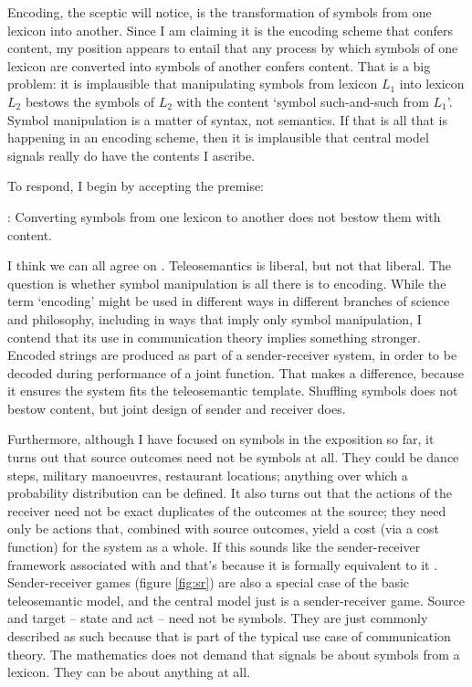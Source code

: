 \documentclass[12pt]{article}
\begin{document}
Encoding, the sceptic will notice, is the transformation of symbols from one lexicon into another.
Since I am claiming it is the encoding scheme that confers content, my position appears to entail that any process by which symbols of one lexicon are converted into symbols of another confers content.
That is a big problem: it is implausible that manipulating symbols from lexicon $L_1$ into lexicon $L_2$ bestows the symbols of $L_2$ with the content `symbol such-and-such from $L_1$'.
Symbol manipulation is a matter of syntax, not semantics.
If that is all that is happening in an encoding scheme, then it is implausible that central model signals really do have the contents I ascribe.

To respond, I begin by accepting the premise:

\begin{myquote}
\smi{}: Converting symbols from one lexicon to another does not bestow them with content.
\end{myquote}

\noindent I think we can all agree on \smi{}.
Teleosemantics is liberal, but not that liberal.
The question is whether symbol manipulation is all there is to encoding.
While the term `encoding' might be used in different ways in different branches of science and philosophy, including in ways that imply only symbol manipulation, I contend that its use in communication theory implies something stronger.
Encoded strings are produced as part of a sender-receiver system, in order to be decoded during performance of a joint function.
That makes a difference, because it ensures the system fits the teleosemantic template.
Shuffling symbols does not bestow content, but joint design of sender and receiver does.

Furthermore, although I have focused on symbols in the exposition so far, it turns out that source outcomes need not be symbols at all.
They could be dance steps, military manoeuvres, restaurant locations; anything over which a probability distribution can be defined.
It also turns out that the actions of the receiver need not be exact duplicates of the outcomes at the source; they need only be actions that, combined with source outcomes, yield a cost (via a cost function) for the system as a whole.
If this sounds like the sender-receiver framework associated with \citet{skyrms2010signals} and \citet{lewis1969convention} that's because it is formally equivalent to it \citep{martinez2019deception}.
Sender-receiver games (figure \ref{fig:sr}) are also a special case of the basic teleosemantic model, and the central model just is a sender-receiver game.
Source and target -- state and act -- need not be symbols.
They are just commonly described as such because that is part of the typical use case of communication theory.
The mathematics does not demand that signals be about symbols from a lexicon.
They can be about anything at all.
\end{document}
